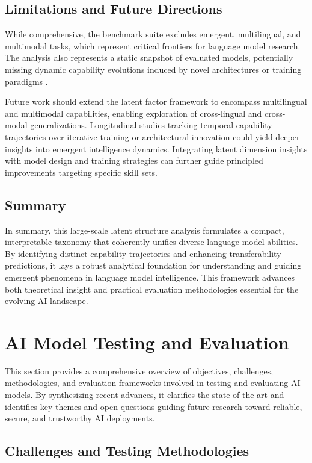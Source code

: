 \documentclass[sigconf]{acmart}
\begin{document}
\subsection{Limitations and Future Directions}

While comprehensive, the benchmark suite excludes emergent, multilingual, and multimodal tasks, which represent critical frontiers for language model research. The analysis also represents a static snapshot of evaluated models, potentially missing dynamic capability evolutions induced by novel architectures or training paradigms \cite{ref45}. 

Future work should extend the latent factor framework to encompass multilingual and multimodal capabilities, enabling exploration of cross-lingual and cross-modal generalizations. Longitudinal studies tracking temporal capability trajectories over iterative training or architectural innovation could yield deeper insights into emergent intelligence dynamics. Integrating latent dimension insights with model design and training strategies can further guide principled improvements targeting specific skill sets.

\subsection{Summary}

In summary, this large-scale latent structure analysis formulates a compact, interpretable taxonomy that coherently unifies diverse language model abilities. By identifying distinct capability trajectories and enhancing transferability predictions, it lays a robust analytical foundation for understanding and guiding emergent phenomena in language model intelligence. This framework advances both theoretical insight and practical evaluation methodologies essential for the evolving AI landscape.

\section{AI Model Testing and Evaluation}

This section provides a comprehensive overview of objectives, challenges, methodologies, and evaluation frameworks involved in testing and evaluating AI models. By synthesizing recent advances, it clarifies the state of the art and identifies key themes and open questions guiding future research toward reliable, secure, and trustworthy AI deployments.

\subsection{Challenges and Testing Methodologies}
\end{document}
